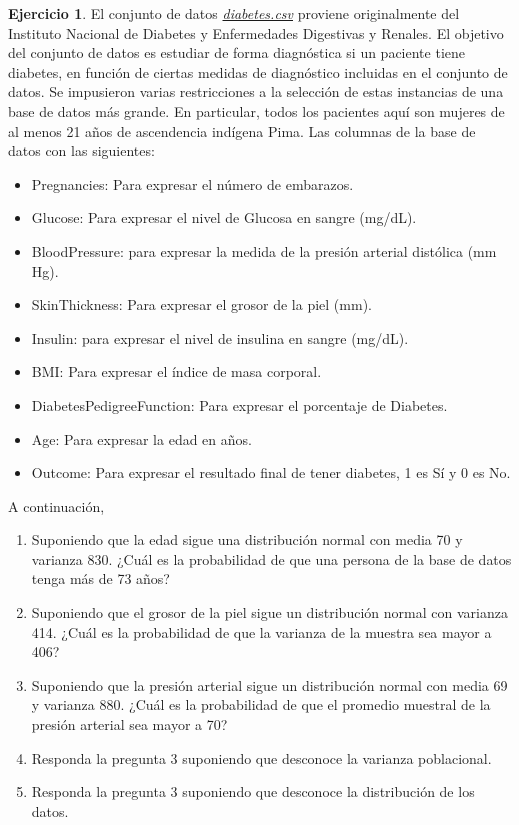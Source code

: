 \documentclass[
  11pt,
]{book}
\providecommand{\tightlist}{%
  \setlength{\itemsep}{0pt}\setlength{\parskip}{0pt}}
\theoremstyle{definition}
\theoremstyle{definition}
\theoremstyle{definition}
\newtheorem{exercise}{Ejercicio}[chapter]
\theoremstyle{definition}
\theoremstyle{remark}
\begin{document}
\begin{exercise}

El conjunto de datos \href{https://raw.githubusercontent.com/Dfranzani/Bases-de-datos-para-cursos/main/2022-2/Estad\%C3\%ADstica\%201/diabetes.csv}{\emph{diabetes.csv}} proviene originalmente del Instituto Nacional de Diabetes y Enfermedades Digestivas y Renales. El objetivo del conjunto de datos es estudiar de forma diagnóstica si un paciente tiene diabetes, en función de ciertas medidas de diagnóstico incluidas en el conjunto de datos. Se impusieron varias restricciones a la selección de estas instancias de una base de datos más grande. En particular, todos los pacientes aquí son mujeres de al menos 21 años de ascendencia indígena Pima. Las columnas de la base de datos con las siguientes:

\begin{itemize}
\tightlist
\item
  Pregnancies: Para expresar el número de embarazos.
\item
  Glucose: Para expresar el nivel de Glucosa en sangre (mg/dL).
\item
  BloodPressure: para expresar la medida de la presión arterial distólica (mm Hg).
\item
  SkinThickness: Para expresar el grosor de la piel (mm).
\item
  Insulin: para expresar el nivel de insulina en sangre (mg/dL).
\item
  BMI: Para expresar el índice de masa corporal.
\item
  DiabetesPedigreeFunction: Para expresar el porcentaje de Diabetes.
\item
  Age: Para expresar la edad en años.
\item
  Outcome: Para expresar el resultado final de tener diabetes, 1 es Sí y 0 es No.
\end{itemize}

A continuación,

\begin{enumerate}
\def\labelenumi{\arabic{enumi}.}
\tightlist
\item
  Suponiendo que la edad sigue una distribución normal con media 70 y varianza 830. ¿Cuál es la probabilidad de que una persona de la base de datos tenga más de 73 años?
\item
  Suponiendo que el grosor de la piel sigue un distribución normal con varianza 414. ¿Cuál es la probabilidad de que la varianza de la muestra sea mayor a 406?
\item
  Suponiendo que la presión arterial sigue un distribución normal con media 69 y varianza 880. ¿Cuál es la probabilidad de que el promedio muestral de la presión arterial sea mayor a 70?
\item
  Responda la pregunta 3 suponiendo que desconoce la varianza poblacional.
\item
  Responda la pregunta 3 suponiendo que desconoce la distribución de los datos.
\end{enumerate}

\end{exercise}
\end{document}
